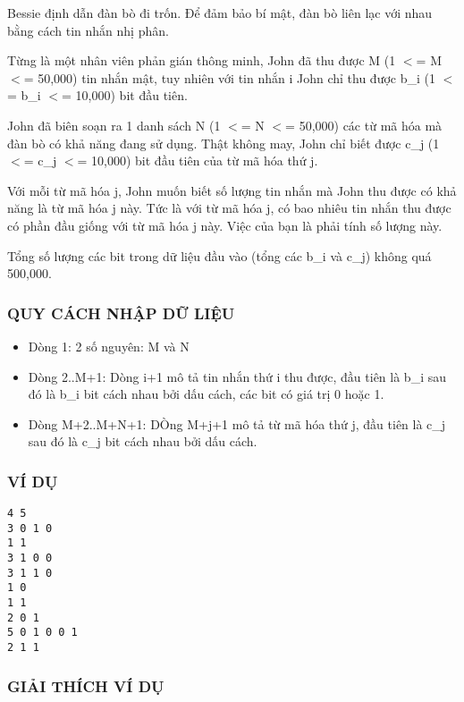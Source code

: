 



   Bessie định dẫn đàn bò đi trốn. Để đảm bảo bí mật, đàn bò liên lạc với nhau bằng cách tin nhắn nhị phân.  

   Từng là một nhân viên phản gián thông minh, John đã thu được M  (1 $<$= M $<$= 50,000) tin nhắn mật, tuy nhiên với tin nhắn i John chỉ  thu được b\_i (1 $<$= b\_i $<$= 10,000) bit đầu tiên.  

   John đã biên soạn ra 1 danh sách N (1 $<$= N $<$= 50,000) các từ mã hóa mà đàn bò có khả năng đang sử dụng. Thật không may, John chỉ biết  được c\_j (1 $<$= c\_j $<$= 10,000) bit đầu tiên của từ mã hóa thứ j.  

   Với mỗi từ mã hóa j, John muốn biết số lượng tin nhắn mà John  thu được có khả năng là từ mã hóa j này. Tức là với từ mã hóa j, có bao  nhiêu tin nhắn thu được có phần đầu giống với từ mã hóa j này. Việc  của bạn là phải tính số lượng này.  

   Tổng số lượng các bit trong dữ liệu đầu vào (tổng các b\_i và c\_j) không quá 500,000.  

\subsubsection{   QUY CÁCH NHẬP DỮ LIỆU  }
\begin{itemize}
	\item     Dòng 1: 2 số nguyên: M và N   
	\item     Dòng 2..M+1: Dòng i+1 mô tả tin nhắn thứ i thu được, đầu tiên là b\_i         sau đó là b\_i bit cách nhau bởi dấu cách, các bit có giá trị 0 hoặc 1.   
	\item     Dòng M+2..M+N+1: DÒng M+j+1 mô tả từ mã hóa thứ j, đầu tiên là c\_j         sau đó là c\_j bit cách nhau bởi dấu cách.   
\end{itemize}

\subsubsection{   VÍ DỤ  }
\begin{verbatim}
4 5
3 0 1 0
1 1
3 1 0 0
3 1 1 0
1 0
1 1
2 0 1
5 0 1 0 0 1
2 1 1
\end{verbatim}

\subsubsection{   GIẢI THÍCH VÍ DỤ  }

